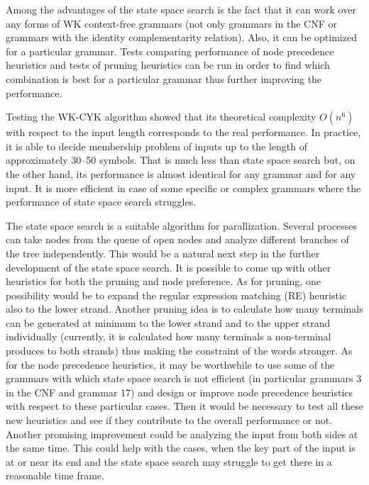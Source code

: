 Among the advantages of the state space search is the fact that it can work over any forms of WK context-free grammars (not only grammars in the CNF or grammars with the identity complementarity relation). Also, it can be optimized for a particular grammar. Tests comparing performance of node precedence heuristics and tests of pruning heuristics can be run in order to find which combination is best for a particular grammar thus further improving the performance.

Testing the WK-CYK algorithm showed that its theoretical complexity $O(n^6)$ with respect to the input length corresponds to the real performance. In practice, it is able to decide membership problem of inputs up to the length of approximately 30--50 symbols. That is much less than state space search but, on the other hand, its performance is almost identical for any grammar and for any input. It is more efficient in case of some specific or complex grammars where the performance of state space search struggles.

The state space search is a suitable algorithm for parallization. Several processes can take nodes from the queue of open nodes and analyze different branches of the tree independently. This would be a natural next step in the further development of the state space search.
It is possible to come up with other heuristics for both the pruning and node preference. As for pruning, one possibility would be to expand the regular expression matching (RE) heuristic also to the lower strand.
Another pruning idea is to calculate how many terminals can be generated at minimum to the lower strand and to the upper strand individually (currently, it is calculated how many terminals a non-terminal produces to both strands) thus making the constraint of the words stronger.
As for the node precedence heuristics, it may be worthwhile to use some of the grammars with which state space search is not efficient (in particular grammars 3 in the CNF and grammar 17) and design or improve node precedence heuristics with respect to these particular cases. Then it would be necessary to test all these new heuristics and see if they contribute to the overall performance or not.
Another promising improvement could be analyzing the input from both sides at the same time. This could help with the cases, when the key part of the input is at or near its end and the state space search may struggle to get there in a reasonable time frame.
